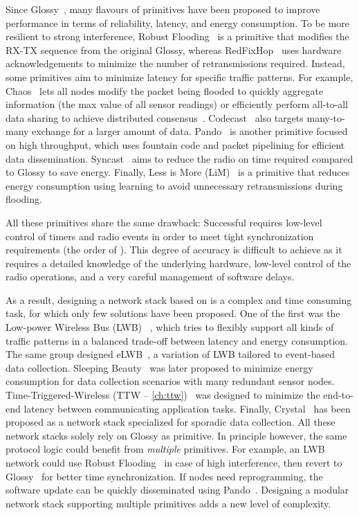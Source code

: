 Since Glossy~\cite{ferrari2011Glossy}, many flavours of \ST primitives have been proposed to improve performance in terms of reliability, latency, and energy consumption.
To be more resilient to strong interference, Robust Flooding~\cite{lim2017Competition} is a primitive that modifies the RX-TX sequence from the original Glossy, whereas RedFixHop~\cite{escobar2016RedFixHop} uses hardware acknowledgements to minimize the number of retransmissions required.
Instead, some primitives aim to minimize latency for specific traffic patterns.
For example, Chaos~\cite{landsiedel2013Chaos} lets all nodes modify the packet being flooded to quickly aggregate information (\eg the max value of all sensor readings) or efficiently perform all-to-all data sharing to achieve distributed consensus~\cite{alnahas2017a2}.
Codecast~\cite{mohammad2018Codecast} also targets many-to-many exchange for a larger amount of data.
Pando~\cite{du2015Pando} is another primitive focused on high throughput, which uses fountain code and packet pipelining for efficient data dissemination.
Syncast~\cite{mohammad2017Improving} aims to reduce the radio on time required compared to Glossy to save energy.
Finally, Less is More (LiM)~\cite{zhang2017LiM} is a primitive that reduces energy consumption using learning to avoid unnecessary retransmissions during flooding.

All these primitives share the same drawback: Successful \ST requires low-level control of timers and radio events in order to meet \ST tight synchronization requirements (the order of \us).
This degree of accuracy is difficult to achieve as it requires a detailed knowledge of the underlying hardware, low-level control of the radio operations, and a very careful management of software delays.

As a result, designing a network stack based on \ST is a complex and time consuming task, for which only few solutions have been proposed.
One of the first was the Low-power Wireless Bus (LWB) ~\cite{ferrari2012LWB}, which tries to flexibly support all kinds of traffic patterns in a balanced trade-off between latency and energy consumption.
The same group designed eLWB~\cite{sutton2017eLWB}, a variation of LWB tailored to event-based data collection.
Sleeping Beauty~\cite{sarkar2016Sleeping} was later proposed to minimize energy consumption for data collection scenarios with many redundant sensor nodes.
Time-Triggered-Wireless (TTW -- \cref{ch:ttw})~\cite{jacob2017TTW_extended} was designed to minimize the end-to-end latency between communicating application tasks.
Finally, Crystal~\cite{istomin2018Interferenceresilient} has been proposed as a network stack specialized for sporadic data collection.
All these network stacks solely rely on Glossy as \ST primitive.
%
In principle however, the same protocol logic could benefit from \textsl{multiple} primitives. For example, an LWB network could use Robust Flooding~\cite{lim2017Competition} in case of high interference, then revert to Glossy~\cite{ferrari2011Glossy} for better time synchronization. If nodes need reprogramming, the software update can be quickly disseminated using Pando~\cite{du2015Pando}.
Designing a modular network stack supporting multiple \ST primitives adds a new level of complexity.

